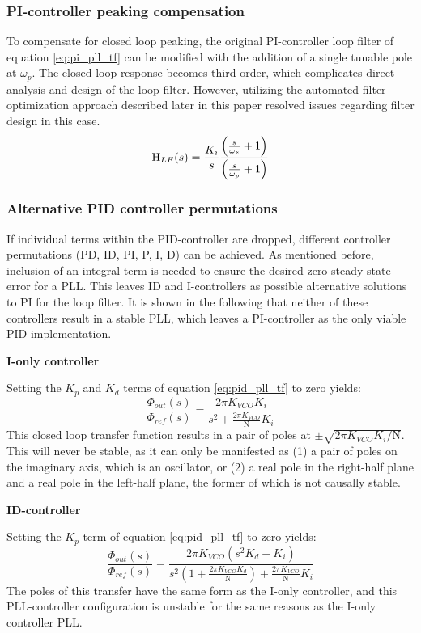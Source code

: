 		\subsubsection{PI-controller peaking compensation}
			 To compensate for closed loop peaking, the original PI-controller loop filter of equation \ref{eq:pi_pll_tf} can be modified with the addition of a single tunable pole at $\omega_p$. The closed loop response becomes third order, which complicates direct analysis and design of the loop filter. However, utilizing the automated filter optimization approach described later in this paper resolved issues regarding filter design in this case.
			\begin{equation} \label{eq:pi_compensated_tf}
				\textnormal{H}_{LF}(s) = \frac{K_i}{s}\frac{\left(\frac{s}{\omega_z} + 1\right)}{\left(\frac{s}{\omega_p} + 1\right)}
			\end{equation}

		\subsubsection{Alternative PID controller permutations} \label{other_pid}
			If individual terms within the PID-controller are dropped, different controller permutations (PD, ID, PI, P, I, D) can be achieved. As mentioned before, inclusion of an integral term is needed to ensure the desired zero steady state error for a PLL. This leaves ID and I-controllers as possible alternative solutions to PI for the loop filter. It is shown in the following that neither of these controllers result in a stable PLL, which leaves a PI-controller as the only viable PID implementation.

			\textbf{I-only controller}

			Setting the $K_p$ and $K_d$ terms of equation \ref{eq:pid_pll_tf} to zero yields:
			\begin{equation}
				\frac{\Phi_{out}(s)}{\Phi_{ref}(s)} = \frac{2\pi K_{VCO}K_i}{s^2 + \frac{2\pi K_{VCO}}{\mathrm{N}}K_i}
			\end{equation}
			This closed loop transfer function results in a pair of poles at $\pm\sqrt{2\pi K_{VCO}K_i/\mathrm{N}}$. This will never be stable, as it can only be manifested as (1) a pair of poles on the imaginary axis, which is an oscillator, or (2) a real pole in the right-half plane and a real pole in the left-half plane, the former of which is not causally stable.

			\textbf{ID-controller}

			Setting the $K_p$ term of equation \ref{eq:pid_pll_tf} to zero yields:
			\begin{equation}
				\frac{\Phi_{out}(s)}{\Phi_{ref}(s)} = \frac{2\pi K_{VCO}\left(s^2K_d + K_i\right)}{s^2\left(1 + \frac{2\pi K_{VCO}K_d}{\mathrm{N}}\right) + \frac{2\pi K_{VCO}}{\mathrm{N}} K_i}
			\end{equation}
			The poles of this transfer have the same form as the I-only controller, and this PLL-controller configuration is unstable for the same reasons as the I-only controller PLL.